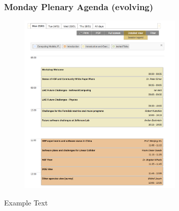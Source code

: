 \begin{frame}
\frametitle{Monday Plenary Agenda (evolving)}

\begin{figure}[htbp]
\begin{center}
\includegraphics[width=0.7\textwidth]{images/20170110-HSF-SDSC-Workshop-1.png}
\end{center}
\end{figure}

\small{Example Text}

\end{frame}


